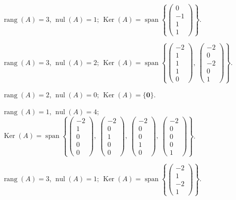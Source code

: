 \documentclass[12pt]{article}
\theoremstyle{remark}
\newcommand{\rang}{\operatorname{rang}}
\newcommand{\nul}{\operatorname{nul}}
\newcommand{\Ker}{\operatorname{Ker}}
\newcommand{\vect}[1]{\boldsymbol{#1}}
\begin{document}
\begin{description}[style=nextline,leftmargin=3em,itemsep=0.45em]
\item[E219.] $\rang(A)=3$, $\nul(A)=1$; $\Ker(A)=\operatorname{span}\left\{\begin{pmatrix}0\\-1\\1\\1\end{pmatrix}\right\}$. 
\item[E220.] $\rang(A)=3$, $\nul(A)=2$; $\Ker(A)=\operatorname{span}\left\{\begin{pmatrix}-2\\1\\1\\1\\0\end{pmatrix},\ \begin{pmatrix}-2\\0\\-2\\0\\1\end{pmatrix}\right\}$. 
\item[E221.] $\rang(A)=2$, $\nul(A)=0$; $\Ker(A)=\{\vect0\}$. 
\item[E222.] $\rang(A)=1$, $\nul(A)=4$; $\Ker(A)=\operatorname{span}\left\{\begin{pmatrix}-2\\1\\0\\0\\0\end{pmatrix},\ \begin{pmatrix}-2\\0\\1\\0\\0\end{pmatrix},\ \begin{pmatrix}-2\\0\\0\\1\\0\end{pmatrix},\ \begin{pmatrix}-2\\0\\0\\0\\1\end{pmatrix}\right\}$. 
\item[E223.] $\rang(A)=3$, $\nul(A)=1$; $\Ker(A)=\operatorname{span}\left\{\begin{pmatrix}-2\\1\\-2\\1\end{pmatrix}\right\}$. 

\end{description}
\end{document}
